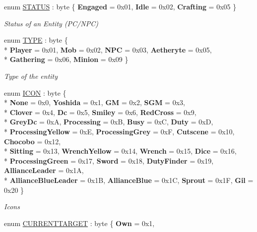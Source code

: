 \begin{DoxyCompactItemize}
enum \hyperlink{namespaceffxivlib_a856915176aeab1f9b643c0243cb008ee}{S\-T\-A\-T\-U\-S} \-: byte \{ {\bfseries Engaged} = 0x01, 
{\bfseries Idle} = 0x02, 
{\bfseries Crafting} = 0x05
 \}
\begin{DoxyCompactList}\small\item\em Status of an Entity (P\-C/\-N\-P\-C) \end{DoxyCompactList}\item 
enum \hyperlink{namespaceffxivlib_aaa4e86d1ea6dbc1661147e6616256e68}{T\-Y\-P\-E} \-: byte \{ \\*
{\bfseries Player} = 0x01, 
{\bfseries Mob} = 0x02, 
{\bfseries N\-P\-C} = 0x03, 
{\bfseries Aetheryte} = 0x05, 
\\*
{\bfseries Gathering} = 0x06, 
{\bfseries Minion} = 0x09
 \}
\begin{DoxyCompactList}\small\item\em Type of the entity \end{DoxyCompactList}\item 
enum \hyperlink{namespaceffxivlib_a3a6b3a65a3fc9ba42586b2ccc07e4aac}{I\-C\-O\-N} \-: byte \{ \\*
{\bfseries None} = 0x0, 
{\bfseries Yoshida} = 0x1, 
{\bfseries G\-M} = 0x2, 
{\bfseries S\-G\-M} = 0x3, 
\\*
{\bfseries Clover} = 0x4, 
{\bfseries Dc} = 0x5, 
{\bfseries Smiley} = 0x6, 
{\bfseries Red\-Cross} = 0x9, 
\\*
{\bfseries Grey\-Dc} = 0x\-A, 
{\bfseries Processing} = 0x\-B, 
{\bfseries Busy} = 0x\-C, 
{\bfseries Duty} = 0x\-D, 
\\*
{\bfseries Processing\-Yellow} = 0x\-E, 
{\bfseries Processing\-Grey} = 0x\-F, 
{\bfseries Cutscene} = 0x10, 
{\bfseries Chocobo} = 0x12, 
\\*
{\bfseries Sitting} = 0x13, 
{\bfseries Wrench\-Yellow} = 0x14, 
{\bfseries Wrench} = 0x15, 
{\bfseries Dice} = 0x16, 
\\*
{\bfseries Processing\-Green} = 0x17, 
{\bfseries Sword} = 0x18, 
{\bfseries Duty\-Finder} = 0x19, 
{\bfseries Alliance\-Leader} = 0x1\-A, 
\\*
{\bfseries Alliance\-Blue\-Leader} = 0x1\-B, 
{\bfseries Alliance\-Blue} = 0x1\-C, 
{\bfseries Sprout} = 0x1\-F, 
{\bfseries Gil} = 0x20
 \}
\begin{DoxyCompactList}\small\item\em Icons \end{DoxyCompactList}\item 
enum \hyperlink{namespaceffxivlib_a027fd426531e3a42243f5c2b946dde31}{C\-U\-R\-R\-E\-N\-T\-T\-A\-R\-G\-E\-T} \-: byte \{ {\bfseries Own} = 0x1, 

\end{DoxyCompactItemize}
